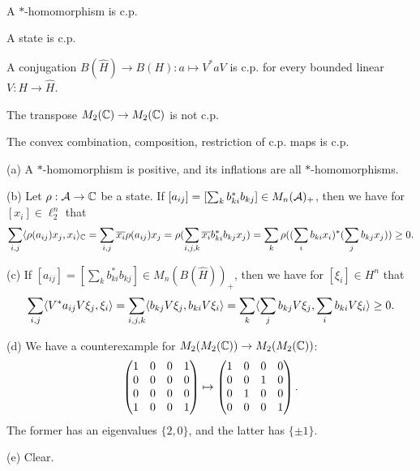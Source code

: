 \documentclass{../../small}
\begin{document}
\begin{ex}\,
\begin{parts}
\item A $*$-homomorphism is c.p.
\item A state is c.p.
\item A conjugation $B(\hat H)\to B(H):a\mapsto V^*aV$ is c.p. for every bounded linear $V:H\to\hat H$.
\item The transpose $M_2(\mathbb{C})\to M_2(\mathbb{C})$ is not c.p.
\item The convex combination, composition, restriction of c.p. maps is c.p.
\end{parts}
\end{ex}
\begin{pf}
(a)
A $*$-homomorphism is positive, and its inflations are all $*$-homomorphisms.

(b)
Let $\rho:\mathcal{A}\to\mathbb{C}$ be a state.
If $[a_{ij}]=[\sum_kb_{ki}^*b_{kj}]\in M_n(\mathcal{A})_+$, then we have for $[x_i]\in\ell_2^n$ that
\[\sum_{i,j}\langle\rho(a_{ij})x_j,x_i\rangle_{\mathbb{C}}=\sum_{i,j}\overline{x_i}\rho(a_{ij})x_j=\rho(\sum_{i,j,k}\overline{x_i}b_{ki}^*b_{kj}x_j)=\sum_k\rho((\sum_ib_{ki}x_i)^*(\sum_jb_{kj}x_j))\ge0.\]

(c)
If $[a_{ij}]=[\sum_kb_{ki}^*b_{kj}]\in M_n(B(\hat H))_+$, then we have for $[\xi_i]\in H^n$ that
\[\sum_{i,j}\langle V^*a_{ij}V\xi_j,\xi_i\rangle=\sum_{i,j,k}\langle b_{kj}V\xi_j,b_{ki}V\xi_i\rangle=\sum_k\langle\sum_jb_{kj}V\xi_j,\sum_ib_{ki}V\xi_i\rangle\ge0.\]

(d)
We have a counterexample for $M_2(M_2(\mathbb{C}))\to M_2(M_2(\mathbb{C}))$:
\[\begin{pmatrix}1&0&0&1\\0&0&0&0\\0&0&0&0\\1&0&0&1\end{pmatrix}\mapsto\begin{pmatrix}1&0&0&0\\0&0&1&0\\0&1&0&0\\0&0&0&1\end{pmatrix}.\]
The former has an eigenvalues $\{2,0\}$, and the latter has $\{\pm1\}$.

(e) Clear.
\end{pf}
\end{document}
